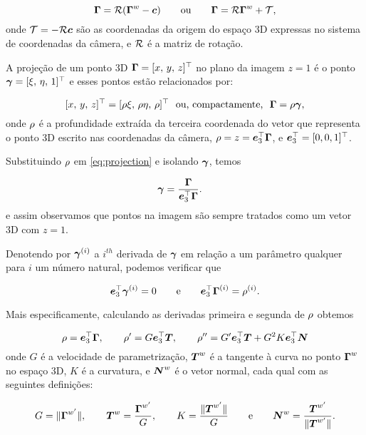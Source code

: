 \begin{equation}\label{eq:coord:transf:RT}
\boldsymbol{\Gamma} = \mathcal{R} (\boldsymbol{\Gamma}^w - \boldsymbol{c}) \qquad \text{ou} \qquad \boldsymbol{\Gamma} = \mathcal{R}\boldsymbol{\Gamma}^w + \mathcal{T},
\end{equation}
onde $\mathcal{T} = -\mathcal{R}\boldsymbol{c}$ são as coordenadas da origem do espaço 3D expressas no sistema de coordenadas da câmera, e $\mathcal{R}$ é a matriz de rotação.

A projeção de um ponto 3D $\boldsymbol{\Gamma} = [x,\, y,\, z]^\top$ no plano da imagem $z=1$ é o ponto $\boldsymbol{\gamma} = [\xi,\,\eta,\,1]^\top$ e esses pontos estão relacionados por:

\begin{equation}\label{eq:projection}[x,\, y,\, z]^\top =
[\rho\xi,\,\rho\eta,\,\rho]^\top \,\,\,\,\text{ou, compactamente,}\,\,\,\,  \boldsymbol{\Gamma} =
\rho\boldsymbol{\gamma},
\end{equation}
onde $\rho$ é a profundidade extraída da terceira coordenada do vetor que representa o ponto 3D escrito nas coordenadas da câmera, $\rho = z = \boldsymbol{e}_3^\top\boldsymbol{\Gamma}$, e $\boldsymbol{e}_3^\top = [0,0,1]^\top$.

Substituindo $\rho$ em \ref{eq:projection} e isolando $\boldsymbol{\gamma}$, temos

\begin{align}
\boldsymbol{\gamma} &= \frac{\boldsymbol{\Gamma}}{\boldsymbol{e}_3^\top\boldsymbol{\Gamma}}.
\label{eq:projection:isolated:gamma}
\end{align}
e assim observamos que pontos na imagem são sempre tratados como um vetor 3D com $z=1$. 

Denotendo por $\boldsymbol{\gamma}^{(i)}$ a $i^{th}$ derivada de $\boldsymbol{\gamma}$ em relação a um parâmetro qualquer para $i$ um número natural, podemos verificar que

\begin{equation*}
\boldsymbol{e}_3^\top\boldsymbol{\gamma}^{(i)} = 0 \qquad \text{e} \qquad \boldsymbol{e}_3^\top\boldsymbol{\Gamma}^{(i)} = \rho^{(i)}.
\end{equation*}

Mais especificamente, calculando as derivadas primeira e segunda de $\rho$ obtemos

\begin{equation}\label{eq:depth:derivs}
\rho =
\boldsymbol{e}_3^\top\boldsymbol{\Gamma},\qquad \rho' = G\boldsymbol{e}_3^\top\boldsymbol{T},\qquad \rho'' = G'\boldsymbol{e}_3^\top\boldsymbol{T} +
G^2K\boldsymbol{e}_3^\top\boldsymbol{N}
\end{equation}
onde $G$ é a velocidade de parametrização, $\boldsymbol{T}^w$ é a tangente à curva no ponto $\boldsymbol{\Gamma}^{w}$ no espaço 3D, $K$ é a curvatura, e $\boldsymbol{N}^w$ é o vetor normal, cada qual com as seguintes definições:

\begin{equation}\label{eq:definicoes}
G  = \|\boldsymbol{\Gamma}^{w'}\|,\qquad \boldsymbol{T}^w = \frac{\boldsymbol{\Gamma}^{w'}}{G}, \qquad K  = \frac{\|\boldsymbol{T}^{w'}\|}{G} \qquad \text{e} \qquad \boldsymbol{N}^w = \frac{\boldsymbol{T}^{w'}}{\|\boldsymbol{T}^{w'}\|}.
\end{equation}

